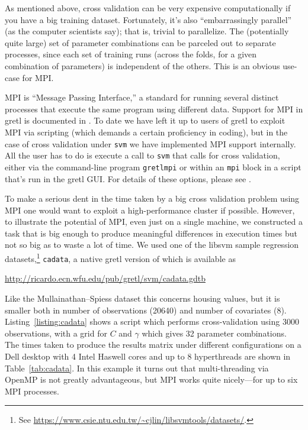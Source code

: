 \documentclass{article}
\begin{document}
As mentioned above, cross validation can be very expensive
computationally if you have a big training dataset. Fortunately, it's
also ``embarrassingly parallel'' (as the computer scientists say);
that is, trivial to parallelize. The (potentially quite large) set of
parameter combinations can be parceled out to separate processes,
since each set of training runs (across the folds, for a given
combination of parameters) is independent of the others. This is an
obvious use-case for MPI.

MPI is ``Message Passing Interface,'' a standard for running several
distinct processes that execute the same program using different
data. Support for MPI in gretl is documented in \cite{gretl-mpi}.  To
date we have left it up to users of gretl to exploit MPI via scripting
(which demands a certain proficiency in coding), but in the case of
cross validation under \texttt{svm} we have implemented MPI support
internally. All the user has to do is execute a call to \texttt{svm}
that calls for cross validation, either via the command-line program
\texttt{gretlmpi} or within an \texttt{mpi} block in a script that's
run in the gretl GUI. For details of these options, please see
\cite{gretl-mpi}.

To make a serious dent in the time taken by a big cross validation
problem using MPI one would want to exploit a high-performance cluster
if possible. However, to illustrate the potential of MPI, even just on
a single machine, we constructed a task that is big enough to produce
meaningful differences in execution times but not so big as to waste a
lot of time. We used one of the \textsf{libsvm} sample regression
datasets,\footnote{See
  \url{https://www.csie.ntu.edu.tw/~cjlin/libsvmtools/datasets/}.}
\texttt{cadata}, a native gretl version of which is available as

\url{http://ricardo.ecn.wfu.edu/pub/gretl/svm/cadata.gdtb}

Like the Mullainathan--Spiess dataset this concerns housing values,
but it is smaller both in number of observations (20640) and number of
covariates (8).  Listing~\ref{listing:cadata} shows a script which
performs cross-validation using 3000 observations, with a grid for $C$
and $\gamma$ which gives 32 parameter combinations. The times taken to
produce the results matrix under different configurations on a Dell
desktop with 4 Intel Haswell cores and up to 8 hyperthreads are shown
in Table~\ref{tab:cadata}. In this example it turns out that
multi-threading via \textsf{OpenMP} is not greatly advantageous, but
MPI works quite nicely---for up to six MPI processes.
\end{document}

